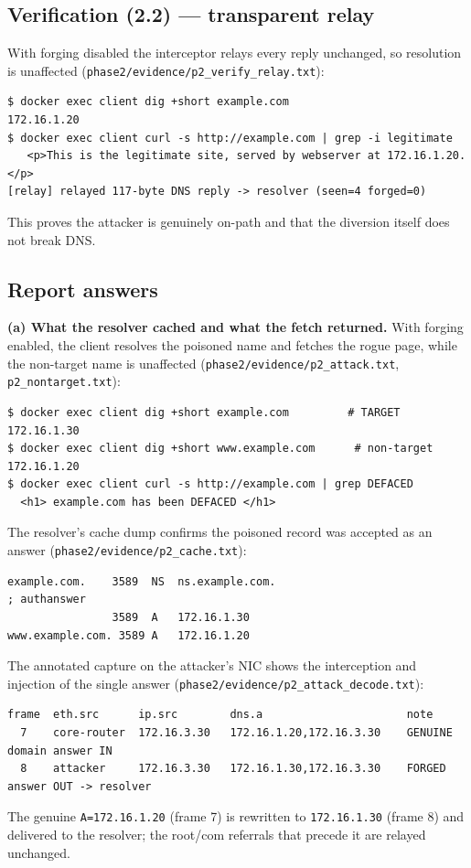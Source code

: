 \documentclass[11pt,a4paper]{article}
\begin{document}
\subsection{Verification (2.2) --- transparent relay}
With forging disabled the interceptor relays every reply unchanged, so resolution is unaffected
(\texttt{phase2/evidence/p2\_verify\_relay.txt}):
\begin{lstlisting}
$ docker exec client dig +short example.com
172.16.1.20
$ docker exec client curl -s http://example.com | grep -i legitimate
   <p>This is the legitimate site, served by webserver at 172.16.1.20.</p>
[relay] relayed 117-byte DNS reply -> resolver (seen=4 forged=0)
\end{lstlisting}
This proves the attacker is genuinely on-path and that the diversion itself does not break DNS.

\subsection{Report answers}

\textbf{(a) What the resolver cached and what the fetch returned.} With forging enabled, the
client resolves the poisoned name and fetches the rogue page, while the non-target name is
unaffected (\texttt{phase2/evidence/p2\_attack.txt}, \texttt{p2\_nontarget.txt}):
\begin{lstlisting}
$ docker exec client dig +short example.com         # TARGET
172.16.1.30
$ docker exec client dig +short www.example.com      # non-target
172.16.1.20
$ docker exec client curl -s http://example.com | grep DEFACED
  <h1> example.com has been DEFACED </h1>
\end{lstlisting}
The resolver's cache dump confirms the poisoned record was accepted as an answer
(\texttt{phase2/evidence/p2\_cache.txt}):
\begin{lstlisting}
example.com.    3589  NS  ns.example.com.
; authanswer
                3589  A   172.16.1.30
www.example.com. 3589 A   172.16.1.20
\end{lstlisting}
The annotated capture on the attacker's NIC shows the interception and injection of the single
answer (\texttt{phase2/evidence/p2\_attack\_decode.txt}):
\begin{lstlisting}
frame  eth.src      ip.src        dns.a                      note
  7    core-router  172.16.3.30   172.16.1.20,172.16.3.30    GENUINE domain answer IN
  8    attacker     172.16.3.30   172.16.1.30,172.16.3.30    FORGED answer OUT -> resolver
\end{lstlisting}
The genuine \texttt{A=172.16.1.20} (frame 7) is rewritten to \texttt{172.16.1.30} (frame 8) and
delivered to the resolver; the root/com referrals that precede it are relayed unchanged.
\end{document}

